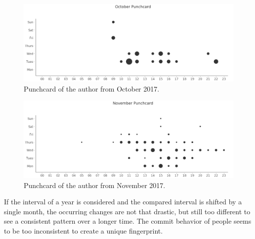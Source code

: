 \begin{figure}[H]
    \includegraphics[scale=0.32]{./graphs/analysis/october-punchcard}
    \centering
    \caption{Punchcard of the author from October 2017.}\label{fig:october-punchcard}
\end{figure}

\begin{figure}[H]
    \includegraphics[scale=0.32]{./graphs/analysis/november-punchcard}
    \centering
    \caption{Punchcard of the author from November 2017.}\label{fig:november-punchcard}
\end{figure}

If the interval of a year is considered and the compared interval is shifted by a single month, the occurring changes are not that drastic, but still too different to see a consistent pattern over a longer time.
The commit behavior of people seems to be too inconsistent to create a unique fingerprint.
